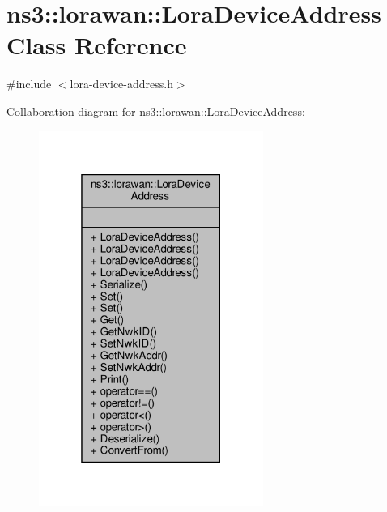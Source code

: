 \hypertarget{classns3_1_1lorawan_1_1LoraDeviceAddress}{}\section{ns3\+:\+:lorawan\+:\+:Lora\+Device\+Address Class Reference}
\label{classns3_1_1lorawan_1_1LoraDeviceAddress}


{\ttfamily \#include $<$lora-\/device-\/address.\+h$>$}



Collaboration diagram for ns3\+:\+:lorawan\+:\+:Lora\+Device\+Address\+:
\nopagebreak
\begin{figure}[H]
\begin{center}
\leavevmode
\includegraphics[width=208pt]{classns3_1_1lorawan_1_1LoraDeviceAddress__coll__graph}
\end{center}
\end{figure}
